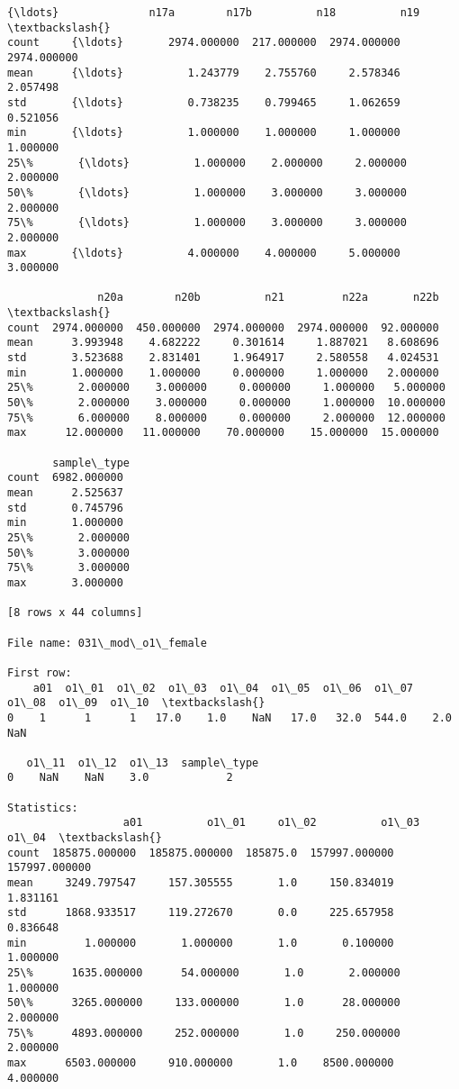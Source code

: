 \documentclass[11pt]{article}
\begin{document}
\begin{Verbatim}[commandchars=\\\{\}]
          {\ldots}              n17a        n17b          n18          n19  \textbackslash{}
count     {\ldots}       2974.000000  217.000000  2974.000000  2974.000000   
mean      {\ldots}          1.243779    2.755760     2.578346     2.057498   
std       {\ldots}          0.738235    0.799465     1.062659     0.521056   
min       {\ldots}          1.000000    1.000000     1.000000     1.000000   
25\%       {\ldots}          1.000000    2.000000     2.000000     2.000000   
50\%       {\ldots}          1.000000    3.000000     3.000000     2.000000   
75\%       {\ldots}          1.000000    3.000000     3.000000     2.000000   
max       {\ldots}          4.000000    4.000000     5.000000     3.000000   

              n20a        n20b          n21         n22a       n22b  \textbackslash{}
count  2974.000000  450.000000  2974.000000  2974.000000  92.000000   
mean      3.993948    4.682222     0.301614     1.887021   8.608696   
std       3.523688    2.831401     1.964917     2.580558   4.024531   
min       1.000000    1.000000     0.000000     1.000000   2.000000   
25\%       2.000000    3.000000     0.000000     1.000000   5.000000   
50\%       2.000000    3.000000     0.000000     1.000000  10.000000   
75\%       6.000000    8.000000     0.000000     2.000000  12.000000   
max      12.000000   11.000000    70.000000    15.000000  15.000000   

       sample\_type  
count  6982.000000  
mean      2.525637  
std       0.745796  
min       1.000000  
25\%       2.000000  
50\%       3.000000  
75\%       3.000000  
max       3.000000  

[8 rows x 44 columns]

File name: 031\_mod\_o1\_female

First row: 
    a01  o1\_01  o1\_02  o1\_03  o1\_04  o1\_05  o1\_06  o1\_07  o1\_08  o1\_09  o1\_10  \textbackslash{}
0    1      1      1   17.0    1.0    NaN   17.0   32.0  544.0    2.0    NaN   

   o1\_11  o1\_12  o1\_13  sample\_type  
0    NaN    NaN    3.0            2  

Statistics: 
                  a01          o1\_01     o1\_02          o1\_03          o1\_04  \textbackslash{}
count  185875.000000  185875.000000  185875.0  157997.000000  157997.000000   
mean     3249.797547     157.305555       1.0     150.834019       1.831161   
std      1868.933517     119.272670       0.0     225.657958       0.836648   
min         1.000000       1.000000       1.0       0.100000       1.000000   
25\%      1635.000000      54.000000       1.0       2.000000       1.000000   
50\%      3265.000000     133.000000       1.0      28.000000       2.000000   
75\%      4893.000000     252.000000       1.0     250.000000       2.000000   
max      6503.000000     910.000000       1.0    8500.000000       4.000000   


\end{Verbatim}
\end{document}
